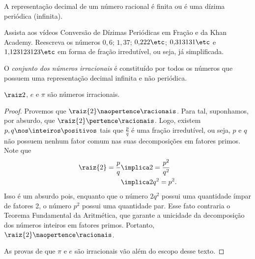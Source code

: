 \begin{remark}
	A representação decimal de um número racional é finita ou é uma dízima periódica (infinita).
\end{remark}

\begin{example}
	Assista aos vídeos Conversão de Dízimas Periódicas em Fração  e  da Khan Academy. Reescreva os números $0{,}6$; $1{,}37$; $0{,}222\etc$; $0{,}313131 \etc$ e $1{,}123123123 \etc$ em forma de fração irredutível, ou seja, já simplificada.
\end{example}

\begin{definition}
	O \emph{conjunto dos números irracionais} é constituído por todos os números que possuem uma representação decimal infinita e não periódica.
\end{definition}

\begin{example}
	$\raiz 2$, $e$ e $\pi$ são números irracionais.
\end{example}

\begin{proof}
	Provemos que $\raiz{2} \naopertence \racionais$. Para tal, suponhamos, por absurdo, que $\raiz{2} \pertence \racionais$. Logo, existem $p, q \nos \inteiros\positivos$ tais que $\frac p q$ é uma fração irredutível, ou seja, $p$ e $q$ não possuem nenhum fator comum nas suas decomposições em fatores primos. Note que
	\begin{align*}
		\raiz{2} = \frac{p}{q} &\implica    2 = \frac{p^2}{q^2} \\
		                       &\implica 2q^2 = p^2.
	\end{align*}
	Isso é um absurdo pois, enquanto que o número $2q^2$ possui uma quantidade ímpar de fatores 2, o número $p^2$ possui uma quantidade par. Esse fato contraria o Teorema Fundamental da Aritmética, que garante a unicidade da decomposição dos números inteiros em fatores primos. Portanto, $\raiz{2} \naopertence \racionais$.

	As provas de que $\pi$ e $e$ são irracionais vão além do escopo desse texto. 
\end{proof}

